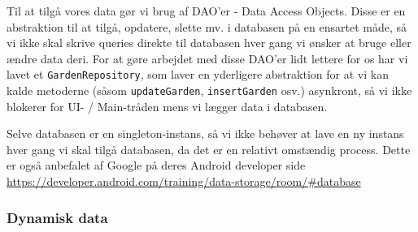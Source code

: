 Til at tilgå vores data gør vi brug af DAO'er - Data Access Objects. Disse er en abstraktion til at tilgå, opdatere, slette mv. i databasen på en ensartet måde, så vi ikke skal skrive queries direkte til databasen hver gang vi ønsker at bruge eller ændre data deri.
For at gøre arbejdet med disse DAO'er lidt lettere for os har vi lavet et \texttt{GardenRepository}, som laver en yderligere abstraktion for at vi kan kalde metoderne (såsom \texttt{updateGarden}, \texttt{insertGarden} osv.) asynkront, så vi ikke blokerer for UI- / Main-tråden mens vi lægger data i databasen.

Selve databasen er en singleton-instans, så vi ikke behøver at lave en ny instans hver gang vi skal tilgå databasen, da det er en relativt omstændig process. Dette er også anbefalet af Google på deres Android developer side \hyperlink{https://developer.android.com/training/data-storage/room/#database}{https://developer.android.com/training/data-storage/room/#database}

\subsubsection{Dynamisk data}
